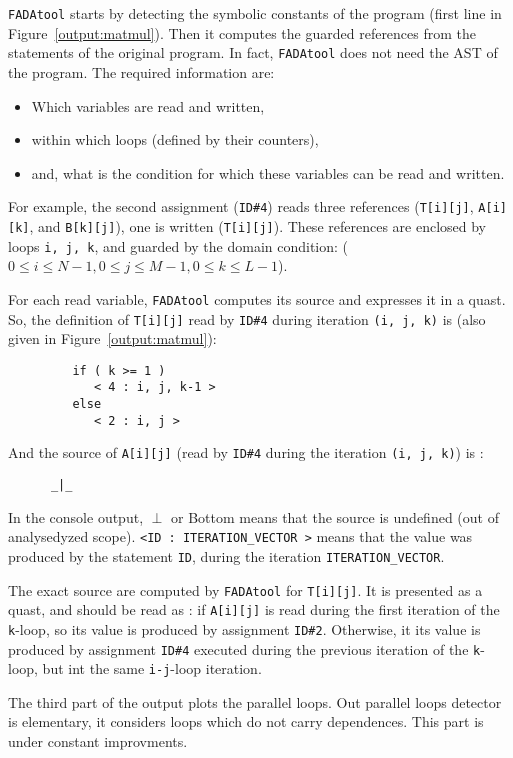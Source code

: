 \verb|FADAtool| starts by detecting the symbolic constants of the program (first line in Figure~\ref{output:matmul}). Then it computes the guarded references from the statements of the original program. In fact, \verb|FADAtool| does not need the AST of the program. The required information are:
\begin{itemize}
 \item Which variables are read and written,
 \item within which loops (defined by their counters),
 \item and, what is the condition for which these variables can be read and written.
\end{itemize}

For example, the second assignment (\verb|ID#4|) reads three references (\verb|T[i][j]|, \verb|A[i][k]|, and \verb|B[k][j]|), one is written (\verb|T[i][j]|). These references are enclosed by loops \verb|i, j, k|, and guarded by the domain condition: ($ 0 \leq i \leq N-1,  0 \leq j \leq M-1, 0 \leq k \leq L-1$).

For each read variable, \verb|FADAtool| computes its source and expresses it in a quast. So, the definition of \verb|T[i][j]| read by \verb|ID#4| during iteration \verb|(i, j, k)| is (also given in Figure~\ref{output:matmul}):


\begin{verbatim}
         if ( k >= 1 )
            < 4 : i, j, k-1 > 
         else
            < 2 : i, j >
\end{verbatim}

And the source of \verb|A[i][j]| (read by \verb|ID#4| during the iteration \verb|(i, j, k)|) is :
\begin{verbatim}
      _|_
\end{verbatim}
In the console output, $\perp$ or Bottom  means that the source is undefined (out of analysedyzed scope). \verb|<ID : ITERATION_VECTOR >|  means that the value was produced by the statement \verb|ID|, during the iteration \verb|ITERATION_VECTOR|.


The exact source are computed by \verb|FADAtool| for \verb|T[i][j]|. It is presented as a quast, and should be read as : if \verb|A[i][j]| is read during the first iteration of the \verb|k|-loop, so its value is produced by assignment \verb|ID#2|. Otherwise, it its value is produced by assignment \verb|ID#4| executed during the previous iteration of the \verb|k|-loop, but int the same \verb|i-j|-loop iteration.


The third part of the output plots the parallel loops. Out parallel loops detector is elementary, it considers loops which do not carry dependences. This part is under constant improvments.